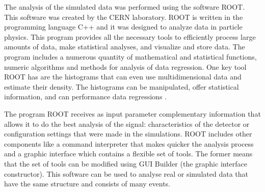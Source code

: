The analysis of the simulated data was performed using the software ROOT. This software was created by the CERN laboratory. ROOT is written in the programming language C++ and it was 
designed to analyze data in particle physics. This program provides all the necessary tools to efficiently process large amounts of data, make statistical analyses, and visualize and store data. The program 
includes a numerous quantity of mathematical and statistical functions, numeric algorithms and methods for analysis of data regression. One key tool ROOT has are the histograms that can even use 
multidimensional data and estimate their density. The histograms can be manipulated, offer statistical information, and can performance data regressions \cite{Root}. 

The program ROOT receives as input parameter complementary information that allows it to do the best analysis of the signal: characteristics of the detector or configuration settings that were 
made in the simulations. ROOT includes other components like a command interpreter that makes quicker the analysis process and a graphic interface which contains a flexible set of tools. The former
means that the set of tools can be modified using GUI Builder (the graphic interface constructor). This software can be used to analyse real or simulated data that have the same structure and 
consists of many events. 


